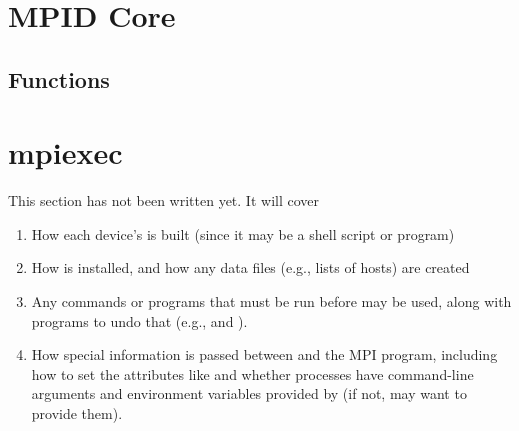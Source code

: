 \documentclass{article}
\begin{document}



\section{MPID Core}
%
\subsection{Functions}

%

\section{mpiexec}
This section has not been written yet.  It will cover
\begin{enumerate}
\item How each device's  is built (since it may be a shell
  script or program)
\item How  is installed, and how any data files (e.g., lists of
  hosts) are created
\item Any commands or programs that must be run before  may be
  used, along with programs to undo that (e.g.,  and
  ). 
\item How special information is passed between  and the MPI
  program, including how to set the attributes like  and
  whether processes have command-line arguments and environment variables
  provided by  (if not,  may want to provide
  them). 
\end{enumerate}
\end{document}
